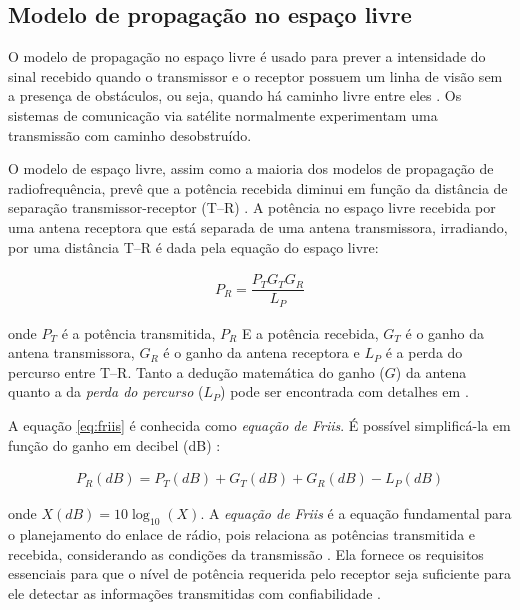 \subsection{Modelo de propagação no espaço livre}
\label{sub:espaco-livre}

O modelo de propagação no espaço livre é usado para prever a intensidade do sinal recebido quando o transmissor e o receptor possuem um linha de visão sem a presença de obstáculos, ou seja, quando há caminho livre entre eles \cite{rappaport2009}. Os sistemas de comunicação via satélite normalmente experimentam uma transmissão com caminho desobstruído.

O modelo de espaço livre, assim como a maioria dos modelos de propagação de radiofrequência, prevê que a potência recebida diminui em função da distância de separação transmissor-receptor (T--R) \cite{rappaport2009}. A potência no espaço livre recebida por uma antena receptora que está separada de uma antena transmissora, irradiando, por uma distância T--R é dada pela equação do espaço livre:

\begin{equation}
	\begin{aligned}
	\label{eq:friis}
		P_R = \dfrac{P_TG_TG_R}{L_P}
	\end{aligned}
\end{equation}

\noindent onde $P_T$ é a potência transmitida, $P_R$ E a potência recebida, $G_T$ é o ganho da antena transmissora, $G_R$ é o ganho da antena receptora e $L_P$ é a perda do percurso entre T--R. Tanto a dedução matemática do ganho ($G$) da antena quanto a da \emph{perda do percurso} ($L_P$) pode ser encontrada com detalhes em .

A equação \ref{eq:friis} é conhecida como \emph{equação de Friis}. É possível simplificá-la em função do ganho em decibel (dB) \cite{haykin2009}:

\begin{equation}
	\begin{aligned}
	\label{eq:friis-decibel}
		P_R(dB) = P_T(dB) + G_T(dB) + G_R(dB) - L_P(dB)
	\end{aligned}
\end{equation}

\noindent onde $X(dB) = 10\log_{10} (X)$. A \emph{equação de Friis} é a equação fundamental para o planejamento do enlace de rádio, pois relaciona as potências transmitida e recebida, considerando as condições da transmissão \cite{haykin2009}. Ela fornece os requisitos essenciais para que o nível de potência requerida pelo receptor seja suficiente para ele detectar as informações transmitidas com confiabilidade \cite{haykin2009}.

